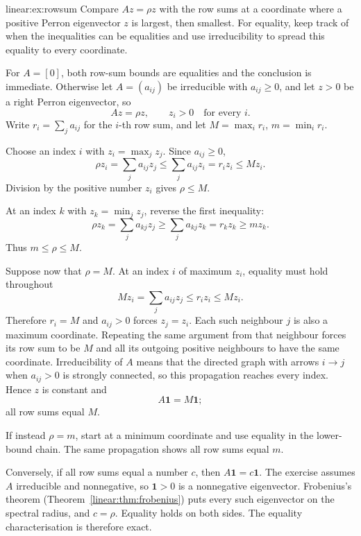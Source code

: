 \begin{solution}{linear:ex:rowsum}
\idea Compare $Az=\rho z$ with the row sums at a coordinate where a positive Perron eigenvector $z$ is largest, then smallest. For equality, keep track of when the inequalities can be equalities and use irreducibility to spread this equality to every coordinate.

\writeup For $A=[0]$, both row-sum bounds are equalities and the conclusion is immediate.
Otherwise let $A=(a_{ij})$ be irreducible with $a_{ij}\ge0$, and let $z>0$ be a right Perron eigenvector, so
\[
Az=\rho z,\qquad z_i>0\quad\text{for every }i.
\]
Write $r_i=\sum_j a_{ij}$ for the $i$-th row sum, and let $M=\max_i r_i$, $m=\min_i r_i$.

Choose an index $i$ with $z_i=\max_j z_j$. Since $a_{ij}\ge0$,
\[
\rho z_i=\sum_j a_{ij}z_j
\le\sum_j a_{ij}z_i=r_i z_i\le Mz_i.
\]
Division by the positive number $z_i$ gives $\rho\le M$.

At an index $k$ with $z_k=\min_j z_j$, reverse the first inequality:
\[
\rho z_k=\sum_j a_{kj}z_j
\ge\sum_j a_{kj}z_k=r_kz_k\ge mz_k.
\]
Thus $m\le\rho\le M$.

Suppose now that $\rho=M$. At an index $i$ of maximum $z_i$, equality must hold throughout
\[
Mz_i=\sum_j a_{ij}z_j\le r_i z_i\le Mz_i.
\]
Therefore $r_i=M$ and $a_{ij}>0$ forces $z_j=z_i$. Each such neighbour $j$ is also a maximum coordinate. Repeating the same argument from that neighbour forces its row sum to be $M$ and all its outgoing positive neighbours to have the same coordinate. Irreducibility of $A$ means that the directed graph with arrows $i\to j$ when $a_{ij}>0$ is strongly connected, so this propagation reaches every index. Hence $z$ is constant and
\[
A\mathbf1=M\mathbf1;
\]
all row sums equal $M$.

If instead $\rho=m$, start at a minimum coordinate and use equality in the lower-bound chain. The same propagation shows all row sums equal $m$.

Conversely, if all row sums equal a number $c$, then $A\mathbf1=c\mathbf1$. The exercise assumes $A$ irreducible and nonnegative, so $\mathbf1>0$ is a nonnegative eigenvector. Frobenius's theorem (Theorem~\ref{linear:thm:frobenius}) puts every such eigenvector on the spectral radius, and $c=\rho$. Equality holds on both sides. The equality characterisation is therefore exact.
\end{solution}


